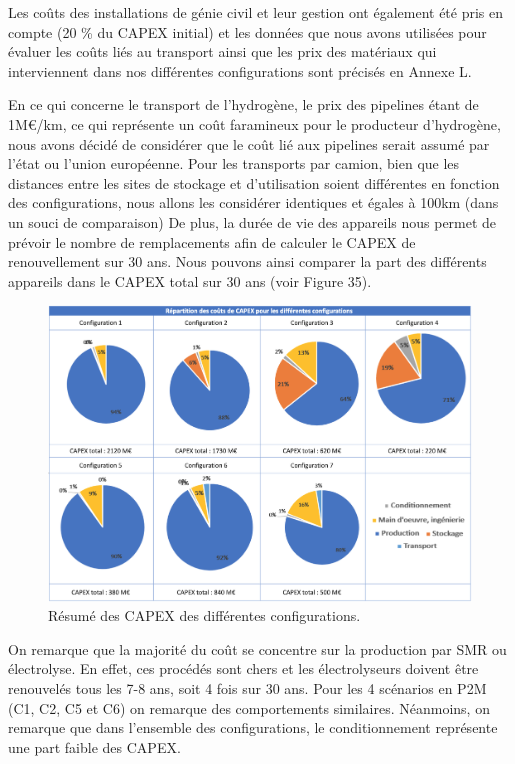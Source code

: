 \documentclass[11pt,french,a4paper]{article}
\begin{document}
Les coûts des installations de génie civil et leur gestion ont également été pris en compte (20 \% du CAPEX initial) et les données que nous avons utilisées pour évaluer les coûts liés au transport ainsi que les prix des matériaux qui interviennent dans nos différentes configurations sont précisés en Annexe L. 

En ce qui concerne le transport de l’hydrogène, le prix des pipelines étant de 1M€/km, ce qui représente un coût faramineux pour le producteur d’hydrogène, nous avons décidé de considérer que le coût lié aux pipelines serait assumé par l’état ou l’union européenne. Pour les transports par camion, bien que les distances entre les sites de stockage et d’utilisation soient différentes en fonction des configurations, nous allons les considérer identiques et égales à 100km (dans un souci de comparaison) 
De plus, la durée de vie des appareils nous permet de prévoir le nombre de remplacements afin de calculer le CAPEX de renouvellement sur 30 ans. Nous pouvons ainsi comparer la part des différents appareils dans le CAPEX total sur 30 ans (voir Figure 35).

\begin{figure}[h!]
\centering
\includegraphics[width=0.9\linewidth]{image/chap5/Tableau 2 chap 5.png}
\caption{Résumé des CAPEX des différentes configurations. }
\end{figure}

On remarque que la majorité du coût se concentre sur la production par SMR ou électrolyse. En effet, ces procédés sont chers et les électrolyseurs doivent être renouvelés tous les 7-8 ans, soit 4 fois sur 30 ans.  
Pour les 4 scénarios en P2M (C1, C2, C5 et C6) on remarque des comportements similaires.  
Néanmoins, on remarque que dans l'ensemble des configurations, le conditionnement représente une part faible des CAPEX.
\end{document}
